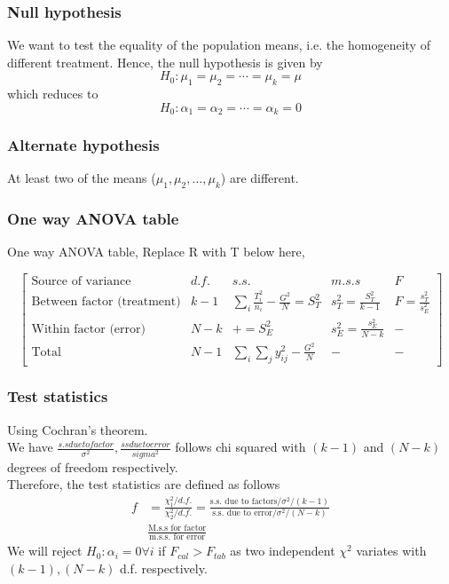 \documentclass[oneside,11pt,pdftex]{book}%
\numberwithin{equation}{section}
\numberwithin{section}{chapter}
\numberwithin{equation}{chapter}
\begin{document}
\subsubsection{Null hypothesis}
We want to test the equality of the population means, i.e. the homogeneity of different treatment. Hence, the null hypothesis is given by 
\[ H_0: \mu_1=\mu_2=\cdots=\mu_k=\mu \]
which reduces to
\[ H_0:\alpha_1=\alpha_2=\cdots=\alpha_k=0 \]

\subsubsection{Alternate hypothesis}
At least two of the means ($ \mu_1, \mu_2, \dots, \mu_k $) are different.
\subsubsection{One way ANOVA table}
One way ANOVA table,
Replace R with T below here,

\[ \begin{bmatrix}
	\text{Source of variance} & d.f. & s.s. & m.s.s & F\\
	\text{Between factor (treatment)} & k-1 & \sum_i \frac{T_i^2}{n_i}-\frac{G^2}{N}=S_T^2 & s^2_T=\frac{S_T^2}{k-1} & F=\frac{s_T^2}{s^2_E}\\
	\text{Within factor (error)} & N-k & + = S_E^2 & s_E^2=\frac{s_E^2}{N-k} & -\\
	\text{Total} & N-1 & \sum_i \sum_j y_{ij}^2-\frac{G^2}{N} & - & -
\end{bmatrix} \]

\subsubsection{Test statistics}
Using Cochran's theorem.\\
We have $ \frac{s.s due to factor}{\sigma^2}, \frac{ss due to error}{sigma^2} $ follows chi squared with $(k-1)$ and $(N-k)$ degrees of freedom respectively.\\
Therefore, the test statistics are defined as follows
\begin{align*}
	f&=\frac{\chi_1^2/d.f.}{\chi_2^2/d.f.}=\frac{\text{s.s. due to factors}/\sigma^2/(k-1)}{\text{s.s. due to error}/\sigma^2/(N-k)}\\
	&\frac{\text{M.s.s for factor}}{\text{m.s.s. for error}}
\end{align*}
We will reject $ H_0: \alpha_i=0 \forall i $ if $ F_{cal}>F_{tab} $ as two independent $ \chi^2 $ variates with $ (k-1) , (N-k)$ d.f. respectively.
\end{document}
